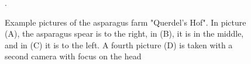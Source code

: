 \begin{figure}
    \centering
    \qquad
    \qquad
    \qquad
    \caption[Example of asparagus images of Querdel's Hof]{Example pictures of the asparagus farm "Querdel's Hof". In picture (A), the asparagus spear is to the right, in (B), it is in the middle, and in (C) it is to the left. A fourth picture (D) is taken with a second camera with focus on the head}.
    \label{fig:ExampleImagesQuerdel}
\end{figure}


